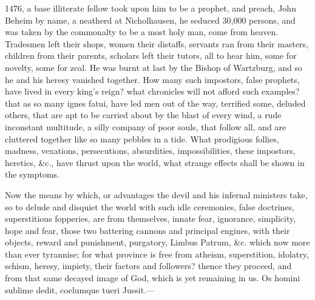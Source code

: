 {1476, a base illiterate fellow took upon him to be a prophet, and
preach, John Beheim by name, a neatherd at Nicholhausen, he seduced
30,000 persons, and was taken by the commonalty to be a most holy man,
come from heaven.  Tradesmen left their shops, women their
distaffs, servants ran from their masters, children from their parents,
scholars left their tutors, all to hear him, some for novelty, some for
zeal. He was burnt at last by the Bishop of Wartzburg, and so he and
his heresy vanished together. How many such impostors, false prophets,
have lived in every king's reign? what chronicles will not afford such
examples? that as so many ignes fatui, have led men out of the way,
terrified some, deluded others, that are apt to be carried about by the
blast of every wind, a rude inconstant multitude, a silly company of
poor souls, that follow all, and are cluttered together like so many
pebbles in a tide. What prodigious follies, madness, vexations,
persecutions, absurdities, impossibilities, these impostors, heretics,
\&c., have thrust upon the world, what strange effects shall be shown in
the symptoms.

Now the means by which, or advantages the devil and his infernal
ministers take, so to delude and disquiet the world with such idle
ceremonies, false doctrines, superstitious fopperies, are from
themselves, innate fear, ignorance, simplicity, hope and fear, those
two battering cannons and principal engines, with their objects, reward
and punishment, purgatory, Limbus Patrum, \&c. which now more than ever
tyrannise; for what province is free from atheism, superstition,
idolatry, schism, heresy, impiety, their factors and followers? thence
they proceed, and from that same decayed image of God, which is yet
remaining in us.
Os homini sublime dedit, coelumque tueri
Jussit.---

}
